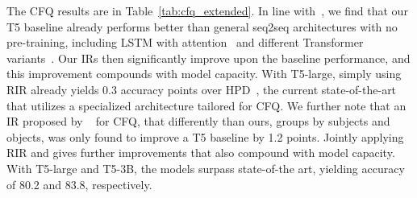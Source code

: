 \begin{table}[t]
\centering
{}
\caption{Text-to-SQL test set results on the template splits, for different model sizes and in comparison with previous work: $\clubsuit$~\cite{finegan-dollak-etal-2018-improving}, $\diamondsuit$~\cite{andreas-2020-good}, and $\spadesuit$~\cite{zheng2020compositional}.}
\label{tab:sql_extended}
\end{table}

The CFQ results are in Table~\ref{tab:cfq_extended}.
In line with~\citet{furrer2020compositional}, we find that our T5 baseline already performs better than general seq2seq architectures with no pre-training, including LSTM with attention~\cite{bahdanau2015neural} and different Transformer variants~\cite{NIPS2017_3f5ee243,dehghani2018universal,so2019evolved}.
Our IRs then significantly improve upon the baseline performance, and this improvement compounds with model capacity. With T5-large, simply using RIR already yields 0.3 accuracy points over HPD~\cite{guo2020hierarchical}, the current state-of-the-art that utilizes a specialized architecture tailored for CFQ. We further note that an IR proposed by ~\citet{furrer2020compositional} for CFQ, that differently than ours, groups by subjects and objects, was only found to improve a T5 baseline by 1.2 points.
Jointly applying RIR and \LIRind{} gives further improvements that also compound with model capacity. With T5-large and T5-3B, the models surpass state-of-the art, yielding accuracy of 80.2 and 83.8, respectively.

